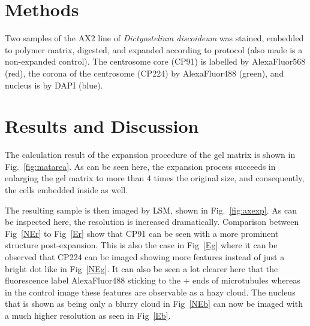 \section{Methods}

Two samples of the AX2 line of \textit{Dictyostelium discoideum} was stained, embedded to polymer matrix, digested, and expanded according to protocol (also made is a non-expanded control).  
The centrosome core (CP91) is labelled by AlexaFluor568 (red), the corona of the centrosome (CP224) by AlexaFluor488 (green), and nucleus is by DAPI (blue).

\section{Results and Discussion}

The calculation result of the expansion procedure of the gel matrix is shown in Fig.~\ref{fig:matarea}. 
As can be seen here, the expansion process succeeds in enlarging the gel matrix to more than 4 times the original size, and consequently, the cells embedded inside as well.  

The resulting sample is then imaged by LSM, shown in Fig.~\ref{fig:axexp}. 
As can be inspected here, the resolution is increased dramatically. 
Comparison between Fig~\ref{NEr} to Fig~\ref{Er} show that CP91 can be seen with a more prominent structure post-expansion. 
This is also the case in Fig~\ref{Eg} where it can be observed that CP224 can be imaged showing more features instead of just a bright dot like in Fig~\ref{NEg}. 
It can also be seen a lot clearer here that the fluorescence label AlexaFluor488 sticking to the $+$ ends of microtubules whereas in the control image these features are observable as a hazy cloud. 
The nucleus that is shown as being only a blurry cloud in Fig~\ref{NEb} can now be imaged with a much higher resolution as seen in Fig~\ref{Eb}.

